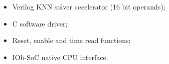 \begin{itemize}
\item Verilog KNN solver accelerator (16 bit operands);
\item C software driver;
\item Reset, enable and time read functions;
\item IOb-SoC native CPU interface.
\end{itemize}
